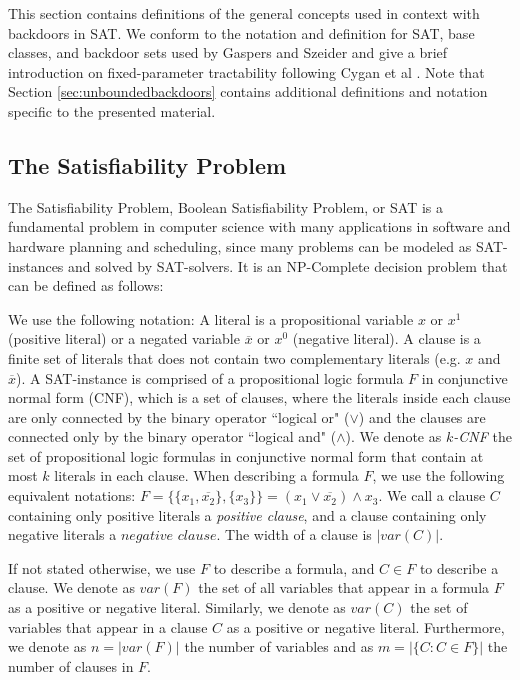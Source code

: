 \documentclass[11pt,a4paper]{article}
\makeatletter
\newcommand{\problemtitle}[1]{\gdef\@problemtitle{#1}}%
\newcommand{\probleminput}[1]{\gdef\@probleminput{#1}}%
\newcommand{\problemquestion}[1]{\gdef\@problemquestion{#1}}%
\theoremstyle{definition}
\theoremstyle{proposition}
\makeatother
\begin{document}
This section contains definitions of the general concepts used in context with backdoors in SAT. We conform to the notation and definition for SAT, base classes, and backdoor sets used by Gaspers and Szeider \cite{Gaspers2012} and give a brief introduction on fixed-parameter tractability following Cygan et al \cite{Cygan2015}. Note that Section \ref{sec:unboundedbackdoors} contains additional definitions and notation specific to the presented material. 
\subsection{The Satisfiability Problem}
The Satisfiability Problem, Boolean Satisfiability Problem, or SAT is a fundamental problem in computer science with many applications in software and hardware planning and scheduling, since many problems can be modeled as SAT-instances and solved by SAT-solvers. It is an NP-Complete decision problem that can be defined as follows: 
\begin{csproblem}
\problemtitle{SAT}
\probleminput{A propositional logic formula $F$ in conjunctive normal form (CNF) over propositional variables $X = \{x_1, x_2, ... , x_n\}$}
\problemquestion{Is there a truth assignment $\tau: X \to \{0,1\}$ (or $\tau \in 2^X$) such that $F[\tau]$ evaluates to $1$?}
\end{csproblem}

We use the following notation: A literal is a propositional variable $x$ or $x^1$ (positive literal) or a negated variable $\overline{x}$ or $x^0$ (negative literal). A clause is a finite set of literals that does not contain two complementary literals (e.g. $x$ and $\overline{x}$). A SAT-instance is comprised of a propositional logic formula $F$ in conjunctive normal form (CNF), which is a set of clauses, where the literals inside each clause are only connected by the binary operator ``logical or" ($\lor$) and the clauses are connected only by the binary operator ``logical and" ($\land$). We denote as \textit{$k$-CNF} the set of propositional logic formulas in conjunctive normal form that contain at most $k$ literals in each clause. When describing a formula $F$, we use the following equivalent notations: $F = \{ \{x_1, \overline{x_2}\}, \{x_3\} \} = (x_1 \lor \overline{x_2}) \land x_3$. We call a clause $C$ containing only positive literals a \textit{positive clause}, and a clause containing only negative literals a $\textit{negative clause}$. The width of a clause is $|var(C)|$. 

If not stated otherwise, we use $F$ to describe a formula, and $C \in F$ to describe a clause. We denote as $var(F)$ the set of all variables that appear in a formula $F$ as a positive or negative literal. Similarly, we denote as $var(C)$ the set of variables that appear in a clause $C$ as a positive or negative literal. Furthermore, we denote as $n = |var(F)|$ the number of variables and as $m = |\{C \colon C \in F \}|$ the number of clauses in $F$.  
\end{document}
